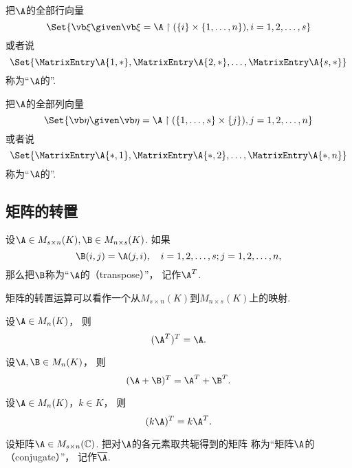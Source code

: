 把\(\A\)的全部行向量\[
	\Set{ \a \given \a=\A\upharpoonright(\{i\}\times\{1,\dotsc,n\}), i=1,2,\dotsc,s }
\]或者说\[
	\Set{\MatrixEntry\A{1,*},\MatrixEntry\A{2,*},\dotsc,\MatrixEntry\A{s,*}}
\]
称为“\(\A\)的”.

把\(\A\)的全部列向量\[
	\Set{ \b \given \b=\A\upharpoonright(\{1,\dotsc,s\}\times\{j\}), j=1,2,\dotsc,n }
\]或者说\[
	\Set{\MatrixEntry\A{*,1},\MatrixEntry\A{*,2},\dotsc,\MatrixEntry\A{*,n}}
\]
称为“\(\A\)的”.

\subsection{矩阵的转置}
\begin{definition}
设\(\A\in M_{s \times n}(K),
\B\in M_{n \times s}(K)\).
如果\[
	\B(i,j)=\A(j,i),
	\quad i=1,2,\dotsc,s;j=1,2,\dotsc,n,
\]
那么把\(\B\)称为“\(\A\)的（transpose）”，
记作\(\A^T\).
\end{definition}
\begin{remark}
矩阵的转置运算可以看作一个从\(M_{s \times n}(K)\)到\(M_{n \times s}(K)\)上的映射.
\end{remark}

\begin{property}\label{theorem:矩阵的转置.性质1}
设\(\A \in M_n(K)\)，
则\begin{equation}
	(\A^T)^T = \A.
\end{equation}
\end{property}

\begin{property}\label{theorem:矩阵的转置.性质2}
设\(\A,\B \in M_n(K)\)，
则\begin{equation}
	(\A+\B)^T = \A^T + \B^T.
\end{equation}
\end{property}

\begin{property}\label{theorem:矩阵的转置.性质3}
设\(\A \in M_n(K)\)，\(k \in K\)，
则\begin{equation}
	(k \A)^T = k \A^T.
\end{equation}
\end{property}

\begin{definition}
设矩阵\(\A \in M_{s \times n}(\mathbb{C})\).
把对\(\A\)的各元素取共轭得到的矩阵
称为“矩阵\(\A\)的（conjugate）”，
记作\(\overline{\A}\).
\end{definition}

